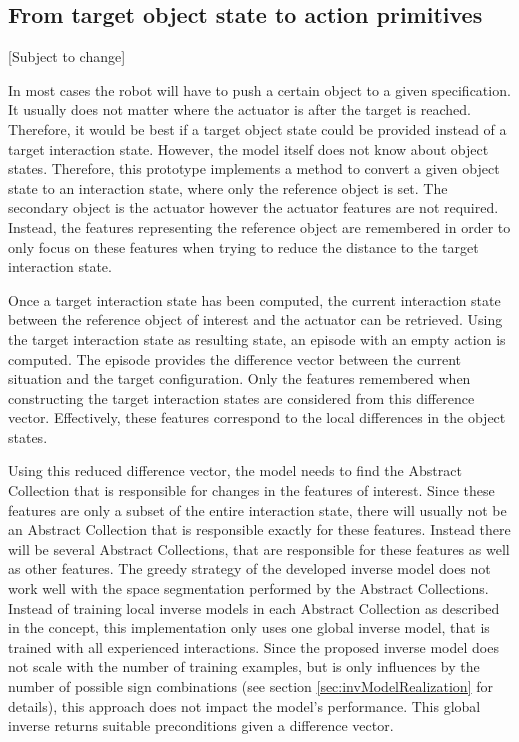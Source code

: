 \subsection{From target object state to action primitives\label{sec:pairPlanningReal}} %

[Subject to change] %

In most cases the robot will have to push a certain object to a given specification. It usually does not matter where the actuator is after the target is reached. Therefore, it would be best if a target object state could be provided instead of a target interaction state. However, the model itself does not know about object states. Therefore, this prototype implements a method to convert a given object state to an interaction state, where only the reference object is set. The secondary object is the actuator however the actuator features are not required. Instead, the features representing the reference object are remembered in order to only focus on these features when trying to reduce the distance to the target interaction state. 

Once a target interaction state has been computed, the current interaction state between the reference object of interest and the actuator can be retrieved. Using the target interaction state as resulting state, an episode with an empty action is computed. The episode provides the difference vector between the current situation and the target configuration. Only the features remembered when constructing the target interaction states are considered from this difference vector. Effectively, these features correspond to the local differences in the object states. 

Using this reduced difference vector, the model needs to find the Abstract Collection that is responsible for changes in the features of interest. Since these features are only a subset of the entire interaction state, there will usually not be an Abstract Collection that is responsible exactly for these features. Instead there will be several Abstract Collections, that are responsible for these features as well as other features. 
The greedy strategy of the developed inverse model does not work well with the space segmentation performed by the Abstract Collections.  
Instead of training local inverse models in each Abstract Collection as described in the concept, this implementation only uses one global inverse model, that is trained with all experienced interactions. 
Since the proposed inverse model does not scale with the number of training examples, but is only influences by the number of possible sign combinations (see section \ref{sec:invModelRealization} for details), this approach does not impact the model's performance.
This global inverse returns suitable preconditions given a difference vector.


